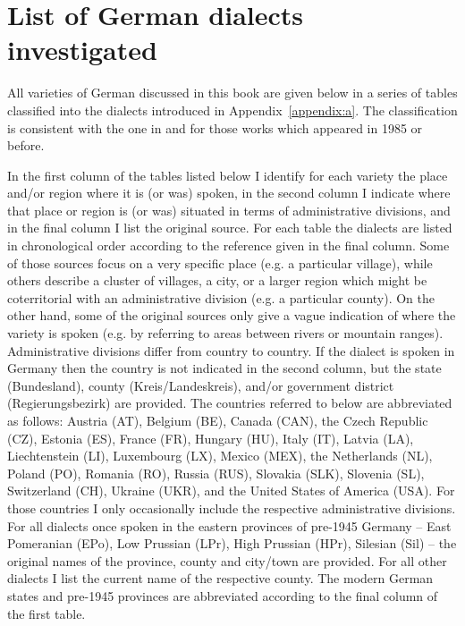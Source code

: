 \chapter{List of German dialects investigated}\label{appendix:c}

All varieties of German discussed in this book are given below in a series of tables classified into the dialects introduced in Appendix~\ref{appendix:a}. The classification is consistent with the one in \citet{WiesingerRaffin1982} and \citet{Wiesinger1987} for those works which appeared in 1985 or before.

In the first column of the tables listed below I identify for each variety the place and/or region where it is (or was) spoken, in the second column I indicate where that place or region is (or was) situated in terms of administrative divisions, and in the final column I list the original source. For each table the dialects are listed in chronological order according to the reference given in the final column. Some of those sources focus on a very specific place (e.g. a particular village), while others describe a cluster of villages, a city, or a larger region which might be coterritorial with an administrative division (e.g. a particular county). On the other hand, some of the original sources only give a vague indication of where the variety is spoken (e.g. by referring to areas between rivers or mountain ranges). Administrative divisions differ from country to country. If the dialect is spoken in Germany then the country is not indicated in the second column, but the state (Bundesland), county (Kreis/Landeskreis), and/or government district (Regierungsbezirk) are provided. The countries referred to below are abbreviated as follows: Austria (AT), Belgium (BE), Canada (CAN), the Czech Republic (CZ), Estonia (ES), France (FR), Hungary (HU), Italy (IT), Latvia (LA), Liechtenstein (LI), Luxembourg (LX), Mexico (MEX), the Netherlands (NL), Poland (PO), Romania (RO), Russia (RUS), Slovakia (SLK), Slovenia (SL), Switzerland (CH), Ukraine (UKR), and the United States of America (USA). For those countries I only occasionally include the respective administrative divisions. For all dialects once spoken in the eastern provinces of pre-1945 Germany -- East Pomeranian (EPo), Low Prussian (LPr), High Prussian (HPr), Silesian (Sil) -- the original names of the province, county and city/town are provided. For all other dialects I list the current name of the respective county. The modern German states and pre-1945 provinces are abbreviated according to the final column of the first table.

